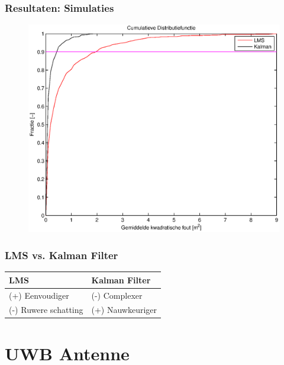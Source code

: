 \documentclass{beamer}
\begin{document}
  \begin{frame}
    \frametitle{Resultaten: Simulaties}
    \begin{figure}
      \begin{center}
        \includegraphics[width=.6\linewidth]{images/simulatie_cumulatief.eps}
      \end{center}
    \end{figure}
  \end{frame}
  \begin{frame}
    \frametitle{LMS vs. Kalman Filter}
    \begin{tabular}{|l|l|}
      \hline
      LMS & Kalman Filter \\
      \hline
      (+) Eenvoudiger & (-) Complexer \\
      (-) Ruwere schatting & (+) Nauwkeuriger \\
      \hline
    \end{tabular}
  \end{frame}
\section{UWB Antenne}
\end{document}
